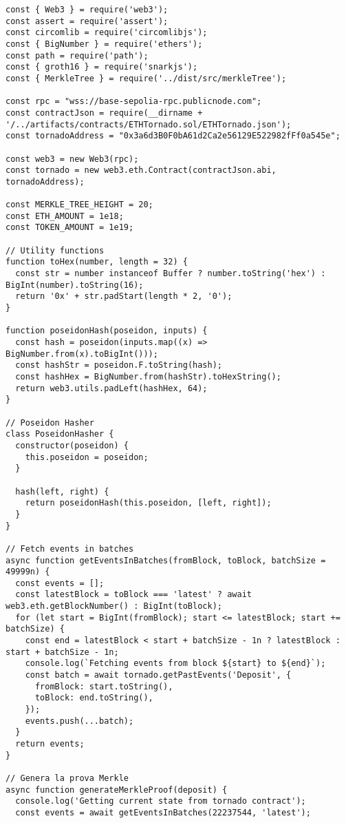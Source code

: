 \begin{lstlisting}
const { Web3 } = require('web3');
const assert = require('assert');
const circomlib = require('circomlibjs');
const { BigNumber } = require('ethers');
const path = require('path');
const { groth16 } = require('snarkjs');
const { MerkleTree } = require('../dist/src/merkleTree');

const rpc = "wss://base-sepolia-rpc.publicnode.com";
const contractJson = require(__dirname + '/../artifacts/contracts/ETHTornado.sol/ETHTornado.json');
const tornadoAddress = "0x3a6d3B0F0bA61d2Ca2e56129E522982fFf0a545e";

const web3 = new Web3(rpc);
const tornado = new web3.eth.Contract(contractJson.abi, tornadoAddress);

const MERKLE_TREE_HEIGHT = 20;
const ETH_AMOUNT = 1e18;
const TOKEN_AMOUNT = 1e19;

// Utility functions
function toHex(number, length = 32) {
  const str = number instanceof Buffer ? number.toString('hex') : BigInt(number).toString(16);
  return '0x' + str.padStart(length * 2, '0');
}

function poseidonHash(poseidon, inputs) {
  const hash = poseidon(inputs.map((x) => BigNumber.from(x).toBigInt()));
  const hashStr = poseidon.F.toString(hash);
  const hashHex = BigNumber.from(hashStr).toHexString();
  return web3.utils.padLeft(hashHex, 64);
}

// Poseidon Hasher
class PoseidonHasher {
  constructor(poseidon) {
    this.poseidon = poseidon;
  }

  hash(left, right) {
    return poseidonHash(this.poseidon, [left, right]);
  }
}

// Fetch events in batches
async function getEventsInBatches(fromBlock, toBlock, batchSize = 49999n) {
  const events = [];
  const latestBlock = toBlock === 'latest' ? await web3.eth.getBlockNumber() : BigInt(toBlock);
  for (let start = BigInt(fromBlock); start <= latestBlock; start += batchSize) {
    const end = latestBlock < start + batchSize - 1n ? latestBlock : start + batchSize - 1n;
    console.log(`Fetching events from block ${start} to ${end}`);
    const batch = await tornado.getPastEvents('Deposit', {
      fromBlock: start.toString(),
      toBlock: end.toString(),
    });
    events.push(...batch);
  }
  return events;
}

// Genera la prova Merkle
async function generateMerkleProof(deposit) {
  console.log('Getting current state from tornado contract');
  const events = await getEventsInBatches(22237544, 'latest');


\end{lstlisting}
